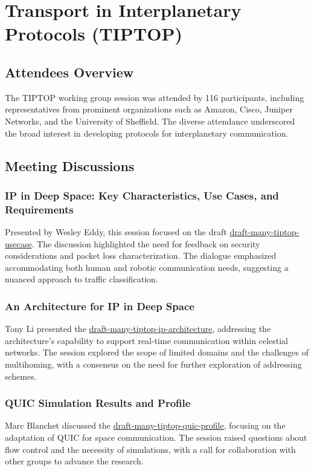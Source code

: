 \documentclass{article}
\begin{document}
\newpage

\section{Transport in Interplanetary Protocols (TIPTOP)}

\subsection{Attendees Overview}
The TIPTOP working group session was attended by 116 participants, including representatives from prominent organizations such as Amazon, Cisco, Juniper Networks, and the University of Sheffield. The diverse attendance underscored the broad interest in developing protocols for interplanetary communication.

\subsection{Meeting Discussions}

\subsubsection{IP in Deep Space: Key Characteristics, Use Cases, and Requirements}
Presented by Wesley Eddy, this session focused on the draft \href{https://datatracker.ietf.org/doc/html/draft-many-tiptop-usecase}{draft-many-tiptop-usecase}. The discussion highlighted the need for feedback on security considerations and packet loss characterization. The dialogue emphasized accommodating both human and robotic communication needs, suggesting a nuanced approach to traffic classification.

\subsubsection{An Architecture for IP in Deep Space}
Tony Li presented the \href{https://datatracker.ietf.org/doc/html/draft-many-tiptop-ip-architecture}{draft-many-tiptop-ip-architecture}, addressing the architecture's capability to support real-time communication within celestial networks. The session explored the scope of limited domains and the challenges of multihoming, with a consensus on the need for further exploration of addressing schemes.

\subsubsection{QUIC Simulation Results and Profile}
Marc Blanchet discussed the \href{https://datatracker.ietf.org/doc/html/draft-many-tiptop-quic-profile}{draft-many-tiptop-quic-profile}, focusing on the adaptation of QUIC for space communication. The session raised questions about flow control and the necessity of simulations, with a call for collaboration with other groups to advance the research.
\end{document}
